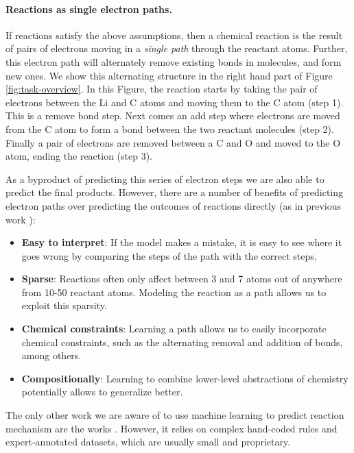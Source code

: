 \paragraph{Reactions as single electron paths.}
If reactions satisfy the above assumptions, then a chemical reaction is the result of pairs of electrons moving in a \emph{single path} through the reactant atoms. 
Further, this electron path will alternately remove existing bonds in molecules, and form new ones. We show this alternating structure in the right hand part of Figure \ref{fig:task-overview}. 
In this Figure, the reaction starts by taking the pair of electrons between the Li and C atoms and moving them to the C atom (step 1). This is a remove bond step. 
Next comes an add step where electrons are moved from the C atom to form a bond between the two reactant molecules (step 2).
Finally a pair of electrons are removed between a C and O and moved to the O atom, ending the reaction (step 3).

As a byproduct of predicting this series of electron steps we are also able to predict the final products.
However, there are a number of benefits of predicting electron paths over predicting the outcomes of reactions directly (as in previous work \cite{jin2017predicting,schwaller2017found}):
\begin{itemize}
\item \textbf{Easy to interpret}: If the model makes a mistake, it is easy to see where it goes wrong by comparing the steps of the path with the correct steps.
\item \textbf{Sparse}: Reactions often only affect between 3 and 7 atoms out of anywhere from 10-50 reactant atoms. Modeling the reaction as a path allows us to exploit this sparsity.
\item \textbf{Chemical constraints}: Learning a path allows us to easily incorporate chemical constraints, such as the alternating removal and addition of bonds, among others.
\item \textbf{Compositionally}: Learning to combine lower-level abstractions of chemistry potentially allows to generalize better.
\end{itemize}
The only other work we are aware of to use machine learning to predict reaction mechanism are the works \cite{kayala2011learning,kayala2012reactionpredictor}. However,
it relies on complex hand-coded rules and expert-annotated datasets, which are usually small and proprietary.

